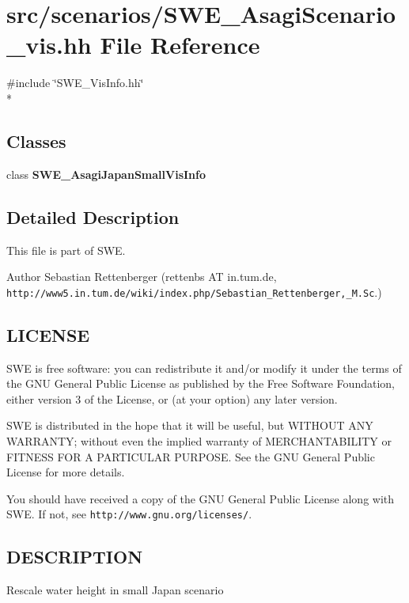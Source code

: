 \section{src/scenarios/\-S\-W\-E\-\_\-\-Asagi\-Scenario\-\_\-vis.hh File Reference}
\label{SWE__AsagiScenario__vis_8hh}
{\ttfamily \#include \char`\"{}S\-W\-E\-\_\-\-Vis\-Info.\-hh\char`\"{}}\\*
\subsection*{Classes}
\begin{DoxyCompactItemize}
\item 
class {\bf S\-W\-E\-\_\-\-Asagi\-Japan\-Small\-Vis\-Info}
\end{DoxyCompactItemize}


\subsection{Detailed Description}
This file is part of S\-W\-E.

\begin{DoxyAuthor}{Author}
Sebastian Rettenberger (rettenbs A\-T in.\-tum.\-de, {\tt http\-://www5.\-in.\-tum.\-de/wiki/index.\-php/\-Sebastian\-\_\-\-Rettenberger,\-\_\-\-M.\-Sc}.)
\end{DoxyAuthor}
\subsection{L\-I\-C\-E\-N\-S\-E}\label{Writer_8hh_LICENSE}
S\-W\-E is free software\-: you can redistribute it and/or modify it under the terms of the G\-N\-U General Public License as published by the Free Software Foundation, either version 3 of the License, or (at your option) any later version.

S\-W\-E is distributed in the hope that it will be useful, but W\-I\-T\-H\-O\-U\-T A\-N\-Y W\-A\-R\-R\-A\-N\-T\-Y; without even the implied warranty of M\-E\-R\-C\-H\-A\-N\-T\-A\-B\-I\-L\-I\-T\-Y or F\-I\-T\-N\-E\-S\-S F\-O\-R A P\-A\-R\-T\-I\-C\-U\-L\-A\-R P\-U\-R\-P\-O\-S\-E. See the G\-N\-U General Public License for more details.

You should have received a copy of the G\-N\-U General Public License along with S\-W\-E. If not, see {\tt http\-://www.\-gnu.\-org/licenses/}.\subsection{D\-E\-S\-C\-R\-I\-P\-T\-I\-O\-N}\label{NetCdfWriter_8hh_DESCRIPTION}
Rescale water height in small Japan scenario 